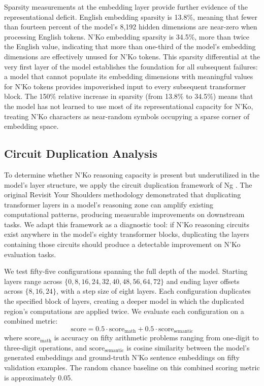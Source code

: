 \documentclass[11pt]{article}
\newcommand{\nko}{N'Ko}
\begin{document}
Sparsity measurements at the embedding layer provide further evidence of the representational deficit. English embedding sparsity is 13.8\%, meaning that fewer than fourteen percent of the model's 8,192 hidden dimensions are near-zero when processing English tokens. \nko{} embedding sparsity is 34.5\%, more than twice the English value, indicating that more than one-third of the model's embedding dimensions are effectively unused for \nko{} tokens. This sparsity differential at the very first layer of the model establishes the foundation for all subsequent failures: a model that cannot populate its embedding dimensions with meaningful values for \nko{} tokens provides impoverished input to every subsequent transformer block. The 150\% relative increase in sparsity (from 13.8\% to 34.5\%) means that the model has not learned to use most of its representational capacity for \nko{}, treating \nko{} characters as near-random symbols occupying a sparse corner of embedding space.

\subsection{Circuit Duplication Analysis}
\label{sec:circuit_dup}

To determine whether \nko{} reasoning capacity is present but underutilized in the model's layer structure, we apply the circuit duplication framework of Ng \cite{ng2024rys}. The original Revisit Your Shoulders methodology demonstrated that duplicating transformer layers in a model's reasoning zone can amplify existing computational patterns, producing measurable improvements on downstream tasks. We adapt this framework as a diagnostic tool: if \nko{} reasoning circuits exist anywhere in the model's eighty transformer blocks, duplicating the layers containing those circuits should produce a detectable improvement on \nko{} evaluation tasks.

We test fifty-five configurations spanning the full depth of the model. Starting layers range across $\{0, 8, 16, 24, 32, 40, 48, 56, 64, 72\}$ and ending layer offsets across $\{8, 16, 24\}$, with a step size of eight layers. Each configuration duplicates the specified block of layers, creating a deeper model in which the duplicated region's computations are applied twice. We evaluate each configuration on a combined metric:
\begin{equation}
\text{score} = 0.5 \cdot \text{score}_{\text{math}} + 0.5 \cdot \text{score}_{\text{semantic}}
\label{eq:rys_score}
\end{equation}
where $\text{score}_{\text{math}}$ is accuracy on fifty arithmetic problems ranging from one-digit to three-digit operations, and $\text{score}_{\text{semantic}}$ is cosine similarity between the model's generated embeddings and ground-truth \nko{} sentence embeddings on fifty validation examples. The random chance baseline on this combined scoring metric is approximately 0.05.
\end{document}
